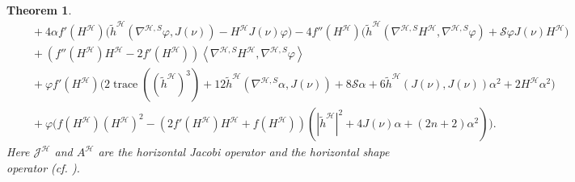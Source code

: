 \documentclass[11pt]{amsart}
\newcommand{\hhh}{{\mathcal{H}}}
\newcommand{\vh}{\nu}
\newcommand{\s}{\mathcal S}
\DeclareMathOperator{\trace}{trace}
\newcommand{\jacobi}{\mathcal{J}}
\newtheorem{theorem}{Theorem}[section]
\theoremstyle{definition}
\theoremstyle{remark}
\numberwithin{equation}{section}
\begin{document}
\begin{theorem}
\begin{equation*}
\begin{split}
            &\quad+4\alpha f'(H^\hhh)\Big(\tilde h^\hhh\left(\nabla^{\hhh,S}\varphi,J(\vh)\right)-H^\hhh J(\vh)\varphi\Big)- 4 f''(H^\hhh)\Big(\tilde h^\hhh\left(\nabla^{\hhh,S}H^\hhh,\nabla^{\hhh,S}\varphi\right)+ \s \varphi J(\vh)H^\hhh\Big)\\
            &\quad+\left(f''(H^\hhh)H^\hhh-2f'(H^\hhh)\right)\left\langle \nabla^{\hhh,S} H^\hhh,\nabla^{\hhh,S}\varphi\right\rangle\\
            &\quad+\varphi f'(H^\hhh)\Big( 2\trace\left(\left(\tilde h^\hhh\right)^3\right)+12\tilde h^\hhh\left(\nabla^{\hhh,S}\alpha,J(\vh)\right)+8\s\alpha+6\tilde h^\hhh(J(\vh),J(\vh))\alpha^2+2 H^\hhh\alpha^2\Big)\\
            &\quad+\varphi \Big ( f(H^\hhh)\left( H^\hhh\right)^2-\left(2f'(H^\hhh) H^\hhh+f(H^\hhh)\right)\left(|\tilde h^\hhh|^2+4J(\vh)\alpha+(2n+2)\alpha^2\right)\Big).
        \end{split}
    \end{equation*}
   Here $\jacobi^\hhh$ and $A^\hhh$ are the horizontal Jacobi operator and the horizontal shape operator (cf. ).
    \end{theorem} 
\end{document}

